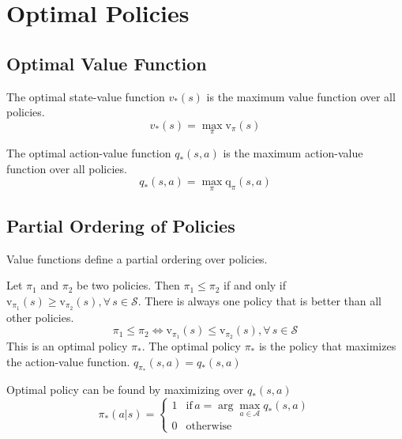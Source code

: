 \begin{itemize}
\begin{center}
\end{center}


\section{Optimal Policies}\label{sec:optimal-policies}


\subsection{Optimal Value Function}\label{subsec:optimal-value-function}
The optimal state-value function $v_{*}(s)$ is the maximum value function over all policies.
\[
    v_{*}(s) = \max_{\pi}\text{v}_{\pi}(s)
\]

The optimal action-value function $q_{*}(s,a)$ is the maximum action-value function over all policies.
\[
    q_{*}(s,a) = \max_{\pi}\text{q}_{\pi}(s,a)
\]

\subsection{Partial Ordering of Policies}\label{subsec:partial-ordering-of-policies}
Value functions define a partial ordering over policies.

\begin{definition}
    \label{def:partial-ordering-of-policies}
    Let $\pi_1$ and $\pi_2$ be two policies.
    Then $\pi_1\leq\pi_2$ if and only if $\text{v}_{\pi_1}(s)\geq\text{v}_{\pi_2}(s),\forall\,s\in\mathcal{S}$.
    There is always one policy that is better than all other policies.
    \[
        \pi_1\leq\pi_2\iff\text{v}_{\pi_1}(s)\leq\text{v}_{\pi_2}(s),\forall\,s\in\mathcal{S}
    \]
    This is an optimal policy $\pi_{*}$.
    The optimal policy $\pi_{*}$ is the policy that maximizes the action-value function.
    $q_{\pi_{*}}(s,a) = q_*(s,a)$
\end{definition}\cite[p.~84]{sutton-2018}

Optimal policy can be found by maximizing over $q_*(s,a)$
\[
    \pi_{*}(a|s) =
    \begin{cases}
        1 & \text{if}\,a=\arg\max_{a\in\mathcal{A}}q_*(s,a) \\
        0 & \text{otherwise}
    \end{cases}
\]



\end{itemize}
